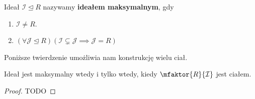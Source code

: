 \begin{definition}
	Ideał $\mathcal{I}\unlhd R$ nazywamy \textbf{ideałem maksymalnym}, gdy
	\begin{enumerate}[label=\arabic*)]
		\item $\mathcal{I}\neq R$.
		\item $\left(\forall \mathcal{J}\unlhd R \right)\left( \mathcal{I} \varsubsetneq \mathcal{J} \implies \mathcal{J} = R\right)  $
	\end{enumerate}
\end{definition} 
Poniższe twierdzenie umożliwia nam konstrukcję wielu ciał.
\begin{theorem}
	Ideał jest maksymalny wtedy i tylko wtedy, kiedy $\mfaktor{R}{\mathcal{I}} $ jest ciałem.
\end{theorem} 
\begin{proof}
	TODO
\end{proof} 

